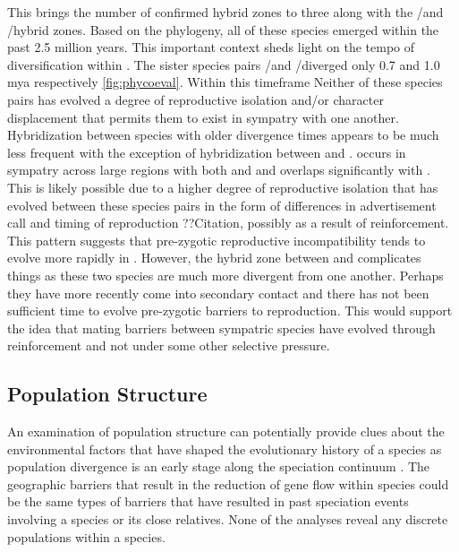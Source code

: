 This brings the number of confirmed \anaxyrus hybrid zones to three along with 
the \amer/\terr and \amer/\hemiophrys hybrid zones. 
Based on the \phycoeval phylogeny, all of these species emerged within the past 
2.5 million years.
This important context sheds light on the tempo of diversification within \anaxyrus.
The sister species pairs \fowl/\wood and \amer/\terr diverged only 0.7 and 1.0 mya
respectively \cref{fig:phycoeval}.
Within this timeframe Neither of these species pairs has evolved a degree of reproductive isolation 
and/or character displacement that permits them to exist in sympatry with one 
another. 
Hybridization between species with older divergence times appears to be much 
less frequent with the exception of hybridization between \amer and \hemiophrys. 
\fowl occurs in sympatry across large regions with both \amer and \terr and 
\wood overlaps significantly with \amer \parencite{conant1998}.
This is likely possible due to a higher degree of reproductive isolation that 
has evolved between these species pairs in the form of differences in 
advertisement call and timing of reproduction ??Citation, possibly as a result %
of reinforcement.
This pattern suggests that pre-zygotic reproductive incompatibility tends to 
evolve more rapidly in \anaxyrus.
However, the hybrid zone between \amer and \hemiophrys complicates things 
as these two species are much more divergent from one another. 
Perhaps they have more recently come into secondary contact and there has not
been sufficient time to evolve pre-zygotic barriers to reproduction. 
This would support the idea that mating barriers between sympatric species 
have evolved through reinforcement and not under some other selective pressure. 

\subsection{Population Structure}
An examination of population structure can potentially provide clues about the 
environmental factors that have shaped the evolutionary history of a species as 
population divergence is an early stage along the speciation continuum \parencite{mallet2008}.
The geographic barriers that result in the reduction of gene flow within species
could be the same types of barriers that have resulted in past speciation events 
involving a species or its close relatives.
None of the \structure analyses reveal any discrete populations within a species.

